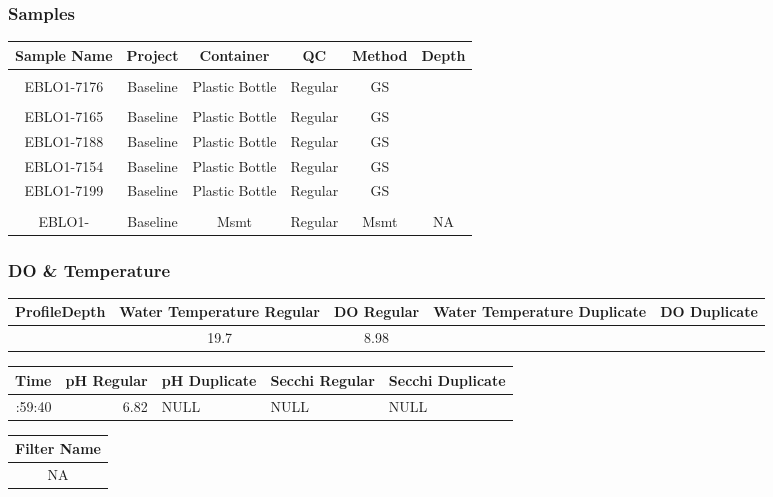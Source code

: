 \documentclass[
  letterpaper,
  DIV=11,
  numbers=noendperiod]{scrartcl}
\begin{document}
\subsubsection{Samples}

\begin{longtable*}{cccccc}
\toprule
Sample Name & Project & Container & QC & Method & Depth \\ 
\midrule\addlinespace[2.5pt]
 \\ 
\midrule\addlinespace[2.5pt]
EBLO1-7176 & Baseline & Plastic Bottle & Regular & GS &  \\ 
\midrule\addlinespace[2.5pt]
 \\ 
\midrule\addlinespace[2.5pt]
EBLO1-7165 & Baseline & Plastic Bottle & Regular & GS &  \\ 
EBLO1-7188 & Baseline & Plastic Bottle & Regular & GS &  \\ 
EBLO1-7154 & Baseline & Plastic Bottle & Regular & GS &  \\ 
EBLO1-7199 & Baseline & Plastic Bottle & Regular & GS &  \\ 
\midrule\addlinespace[2.5pt]
 \\ 
\midrule\addlinespace[2.5pt]
EBLO1- & Baseline & Msmt & Regular & Msmt & NA \\ 
\bottomrule
\end{longtable*}

\subsubsection{DO \& Temperature}

\begin{longtable*}{rcccc}
\toprule
ProfileDepth & Water Temperature Regular & DO Regular & Water Temperature Duplicate & DO Duplicate \\ 
\midrule{} & 19.7 & 8.98 &  &  \\ 
\bottomrule
\end{longtable*}

\begin{longtable*}{rrlll}
\toprule
Time & pH Regular & pH Duplicate & Secchi Regular & Secchi Duplicate \\ 
\midrule{}:59:40 & 6.82 & NULL & NULL & NULL \\ 
\bottomrule
\end{longtable*}

\begin{longtable*}{c}
\toprule
Filter Name \\ 
\midrule\addlinespace[2.5pt]
NA \\ 
\bottomrule
\end{longtable*}
\end{document}
